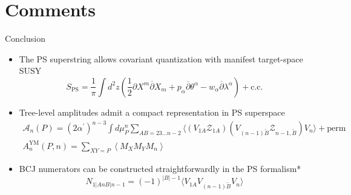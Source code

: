 \documentclass{beamer}
\begin{document}
\section[Comments]{Comments}
\begin{frame}{Conclusion}
	\begin{itemize}
		\item {\color{WHU} The PS superstring allows covariant quantization with manifest target-space SUSY}
		\begin{equation*}
			S_{\mathrm{PS}}=\frac{1}{\pi}\int d^2z\left(\frac{1}{2}\partial X^m\overline{\partial}X_m+p_\alpha\overline{\partial}\theta^\alpha-w_\alpha\overline{\partial}\lambda^\alpha\right)+\mathrm{c.c.}
		\end{equation*}
		\item {\color{WHU} Tree-level amplitudes admit a compact representation in PS superspace}
		{\footnotesize
			\begin{equation*}
				\begin{gathered}
					\mathcal{A}_n(P)=(2\alpha^{\prime})^{n-3}\int d\mu_P^n\sum_{AB=23\ldots n-2}\langle(V_{1A}\mathcal{Z}_{1A})(V_{(n-1)\tilde{B}}\mathcal{Z}_{n-1,\tilde{B}})V_n\rangle+\mathrm{perm}\\
					A_n^{\text{YM}}(P,n)=\sum_{XY=P}\left\langle M_XM_YM_n\right\rangle
				\end{gathered}
			\end{equation*}
		}
		\item {\color{WHU} BCJ numerators can be constructed straightforwardly in the PS formalism*}
		\begin{equation*}
			N_{1|AnB|n-1}=(-1)^{|B|-1}\langle V_{1A}V_{(n-1)\tilde{B}}V_{n}\rangle
		\end{equation*}
	\end{itemize}
\end{frame}
\end{document}
